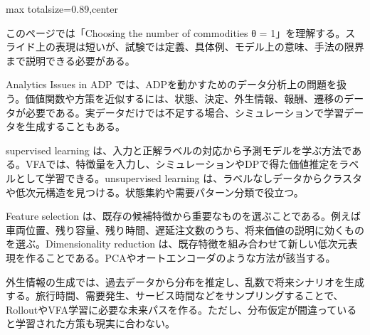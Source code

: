 \begin{minipage}[t]{0.58\textwidth}
\begin{adjustbox}{max totalsize={\textwidth}{0.89\textheight},center}
\begin{minipage}{\textwidth}\scriptsize
{}このページでは「Choosing the number of commodities θ = 1」を理解する。スライド上の表現は短いが、試験では定義、具体例、モデル上の意味、手法の限界まで説明できる必要がある。\par
Analytics Issues in ADP では、ADPを動かすためのデータ分析上の問題を扱う。価値関数や方策を近似するには、状態、決定、外生情報、報酬、遷移のデータが必要である。実データだけでは不足する場合、シミュレーションで学習データを生成することもある。\par
supervised learning は、入力と正解ラベルの対応から予測モデルを学ぶ方法である。VFAでは、特徴量を入力し、シミュレーションやDPで得た価値推定をラベルとして学習できる。unsupervised learning は、ラベルなしデータからクラスタや低次元構造を見つける。状態集約や需要パターン分類で役立つ。\par
Feature selection は、既存の候補特徴から重要なものを選ぶことである。例えば車両位置、残り容量、残り時間、遅延注文数のうち、将来価値の説明に効くものを選ぶ。Dimensionality reduction は、既存特徴を組み合わせて新しい低次元表現を作ることである。PCAやオートエンコーダのような方法が該当する。\par
外生情報の生成では、過去データから分布を推定し、乱数で将来シナリオを生成する。旅行時間、需要発生、サービス時間などをサンプリングすることで、RolloutやVFA学習に必要な未来パスを作る。ただし、分布仮定が間違っていると学習された方策も現実に合わない。\par

\end{minipage}
\end{adjustbox}
\end{minipage}
